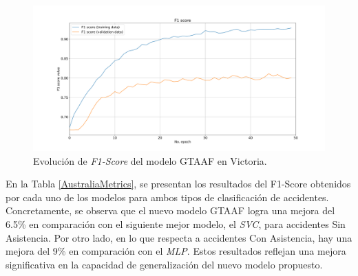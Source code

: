 \begin{figure}[h!]
	\centering
	\includegraphics[width=14cm]{Figures/Victoria/Victoria_convolution_2d_f1_score_paper.png}
	\caption{Evolución de \textit{F1-Score} del modelo GTAAF en Victoria.}
	\label{VictoriaLossFunction}
\end{figure}

En la Tabla \ref{AustraliaMetrics}, se presentan los resultados del F1-Score obtenidos por cada uno de los modelos para ambos tipos de clasificación de accidentes. Concretamente, se observa que el nuevo modelo GTAAF logra una mejora del 6.5\% en comparación con el siguiente mejor modelo, el \textit{SVC}, para accidentes Sin Asistencia. Por otro lado, en lo que respecta a accidentes Con Asistencia, hay una mejora del 9\% en comparación con el \textit{MLP}. Estos resultados reflejan una mejora significativa en la capacidad de generalización del nuevo modelo propuesto.


